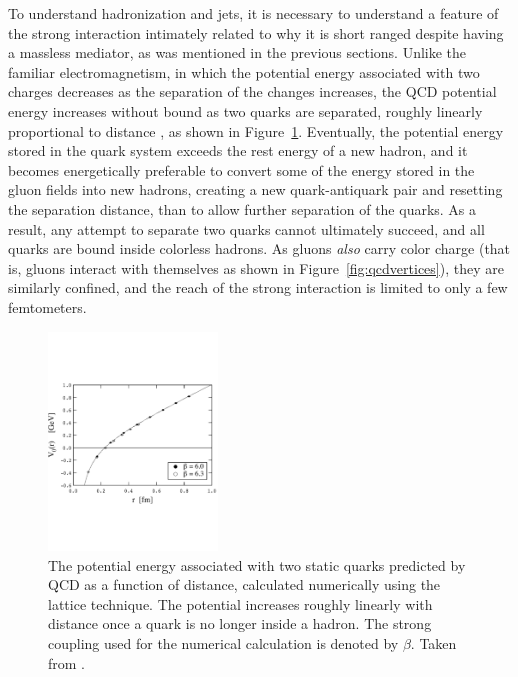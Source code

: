   To understand hadronization and jets, it is necessary to understand a feature of the strong interaction intimately related to why it is short ranged despite having a massless mediator, as was mentioned in the previous sections.
  Unlike the familiar electromagnetism, in which the potential energy associated with two charges decreases as the separation of the changes increases, the QCD potential energy increases without bound as two quarks are separated, roughly linearly proportional to distance \cite{lattice_potential}, as shown in Figure~\ref{fig:QCDpotential}.
  Eventually, the potential energy stored in the quark system exceeds the rest energy of a new hadron, and it becomes energetically preferable to convert some of the energy stored in the gluon fields into new hadrons, creating a new quark-antiquark pair and resetting the separation distance, than to allow further separation of the quarks.
  As a result, any attempt to separate two quarks cannot ultimately succeed, and all quarks are bound inside colorless hadrons. 
  As gluons {\it also} carry color charge (that is, gluons interact with themselves as shown in Figure~\ref{fig:qcdvertices}), they are similarly confined, and the reach of the strong interaction is limited to only a few femtometers.

  \begin{figure}[h!]
    \centering
    \includegraphics[width=0.4\textwidth]{figures/lattice_potential_qcd.pdf}
    \caption[Tracker material budget.]{
      The potential energy associated with two static quarks predicted by QCD as a function of distance, calculated numerically using the lattice technique.
      The potential increases roughly linearly with distance once a quark is no longer inside a hadron.
      The strong coupling used for the numerical calculation is denoted by $\beta$.
      Taken from \cite{lattice_potential}.}
    \label{fig:QCDpotential}
  \end{figure}  

